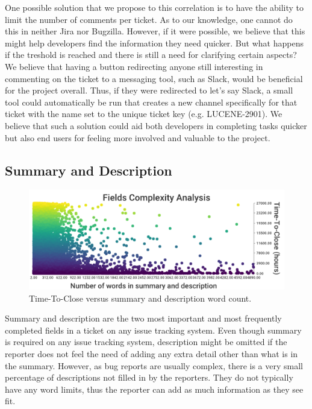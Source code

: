 \documentclass{mpaper}
\begin{document}
One possible solution that we propose to this correlation is to have the ability to limit the number of 
comments per ticket. As to our knowledge, one cannot do this in neither Jira nor Bugzilla. However, if it were 
possible, we believe that this might help developers find the information they need quicker. But what happens 
if the treshold is reached and there is still a need for clarifying certain aspects? We believe that having 
a button redirecting anyone still interesting in commenting on the ticket to a messaging tool, such as 
Slack, would be beneficial for the project overall. Thus, if they were redirected to let's say Slack, a small 
tool could automatically be run that creates a new channel specifically for that ticket with the name set 
to the unique ticket key (e.g. LUCENE-2901). We believe that such a solution could aid both developers in 
completing tasks quicker but also end users for feeling more involved and valuable to the project.

\subsection{Summary and Description}

\begin{figure}[ht]
  \begin{center}
    \includegraphics[scale=0.25]{images/fields_complexity.png}
  \end{center}
  \caption{\label{fields}Time-To-Close versus summary and description word count.}
\end{figure}

Summary and description are the two most important and most frequently completed fields in a ticket on any
issue tracking system. Even though summary is required on any issue tracking system, description might 
be omitted if the reporter does not feel the need of adding any extra detail other than what is in the summary. 
However, as bug reports are usually complex, there is a very small percentage of descriptions not filled in 
by the reporters. They do not typically have any word limits, thus the reporter can add as much information as 
they see fit.
\end{document}

